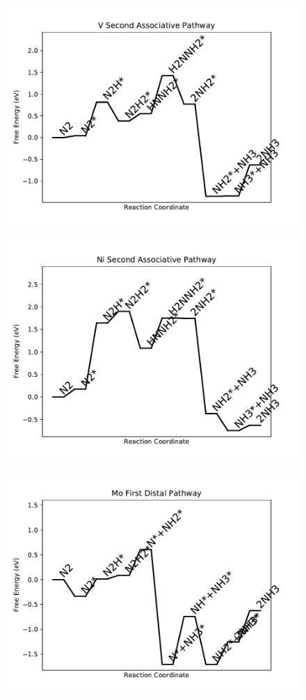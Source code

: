 \begin{figure}
\includegraphics[width=0.8\linewidth]{data/plots/V_associative_2.pdf}
\end{figure}

\begin{figure}
\includegraphics[width=0.8\linewidth]{data/plots/Ni_associative_2.pdf}
\end{figure}

\begin{figure}
\includegraphics[width=0.8\linewidth]{data/plots/Mo_distal_1.pdf}
\end{figure}

